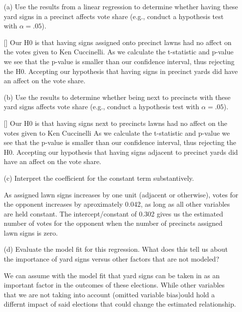 \documentclass[12pt,letterpaper]{article}
\begin{document}
\vspace{.5cm}
\begin{enumerate}
	\item [(a)] Use the results from a linear regression to determine whether having these yard signs in a precinct affects vote share (e.g., conduct a hypothesis test with $\alpha = .05$).
	
		[]
		Our H0 is that having signs assigned onto precinct lawns had no affect on the votes given to Ken Cuccinelli.
		As we calculate the t-statistic and p-value we see that the p-value is smaller than our confidence interval, thus rejecting the H0. Accepting our hypothesis that having signs in precinct yards did have an affect on the vote share.
	
	\newpage		
	\item [(b)]  Use the results to determine whether being
	next to precincts with these yard signs affects vote
	share (e.g., conduct a hypothesis test with $\alpha = .05$).
	
		[]
		Our H0 is that having signs next to precincts lawns had no affect on the votes given to Ken Cuccinelli
		As we calculate the t-statistic and p-value we see that the p-value is smaller than our confidence interval, thus rejecting the H0. Accepting our hypothesis that having signs adjacent to precinct yards did have an affect on the vote share.
	
	\vspace{7cm}
	\item [(c)] Interpret the coefficient for the constant term substantively.
	
	As  assigned lawn signs increases by one unit (adjacent or otherwise), votes for the opponent increases by aproximately 0.042, as long as all other variables are held constant. The intercept/constant of 0.302 gives us the estimated number of votes for the opponent when the number of precincts assigned lawn signs is zero.
	
	\vspace{7cm}
	
	\item [(d)] Evaluate the model fit for this regression.  What does this	tell us about the importance of yard signs versus other factors that are not modeled?
	
	We can assume with the model fit that yard signs can be taken in as an important factor in the outcomes of these elections. While other variables that we are not taking into account (omitted variable bias)ould hold a differnt impact of said elections that could change the estimated relationship.
	
\end{enumerate}  
\end{document}
